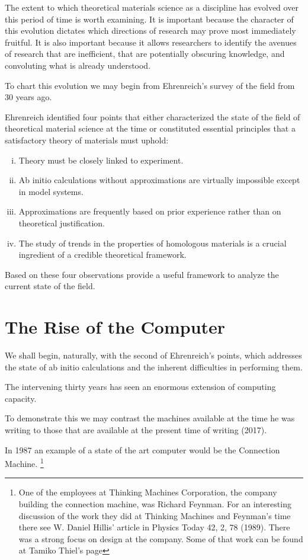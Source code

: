 The extent to which theoretical materials science as a discipline has evolved over this period of time is worth examining. 
It is important because the character of this evolution dictates which directions of research may prove most
immediately fruitful. It is also important because it allows researchers to identify the avenues
of research that are inefficient, that are potentially obscuring knowledge, and convoluting 
what is already understood. 

To chart this evolution we may begin from Ehrenreich's survey of the field from 30 years ago.

Ehrenreich identified four points that either characterized the state 
of the field of theoretical material science at the time or constituted essential principles 
that a satisfactory theory of materials must uphold:
%
\begin{enumerate}[i)]
\item Theory must be closely linked to experiment.
\item Ab initio calculations without approximations are virtually impossible except in model systems.
\item Approximations are frequently based on prior experience rather than on theoretical justification.
\item The study of trends in the properties of homologous materials 
      is a crucial ingredient of a credible theoretical framework.
\end{enumerate}
%
Based on these four observations provide a useful framework to 
analyze the current state of the field.

\section{The Rise of the Computer}
\label{sec:riseofcomp}
We shall begin, naturally, with the second of Ehrenreich's points, 
which addresses the state of ab initio calculations
and the inherent difficulties in performing them. 

The intervening thirty years has seen an enormous extension of computing capacity. 

To demonstrate this we may contrast the machines available at the time
he was writing to those that are available at the present time of writing (2017). 

In 1987 an example of a state of the art computer would be the Connection Machine.
\footnote{One of the employees at Thinking Machines Corporation,
the company building the connection machine, was Richard Feynman.
For an interesting discussion of the work they
did at Thinking Machines and Feynman's time there see W. Daniel
Hillis' article in Physics Today 42, 2, 78 (1989).
There was a strong focus on design at the company. Some of that
work can be found at Tamiko Thiel's page}%


